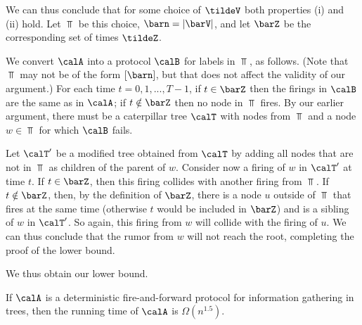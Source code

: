 We can thus conclude that for some choice of $\tildeV$ both properties (i) and (ii)
hold. Let $\barV$ be this choice, $\barn = |\barV|$, and let $\barZ$ be the corresponding
set of times $\tildeZ$.

We convert $\calA$ into a protocol $\calB$ for labels in $\barV$, as follows.
(Note that $\barV$ may not be of the form $[\barn]$, but that does not affect the validity of our argument.)
For each time $t = 0,1,...,T-1$, if $t\in \barZ$ then the firings in $\calB$ are the same as in $\calA$;
if $t\notin\barZ$ then no node in $\barV$ fires.
By our earlier argument, there must be a caterpillar tree $\calT$ with nodes from $\barV$ and a node $w \in \barV$
for which $\calB$ fails. 

Let $\calT'$ be a modified tree obtained from $\calT$ by adding all nodes that are not in $\barV$
as children of the parent of $w$.
Consider now a firing of $w$ in $\calT'$ at time $t$.
If $t \in \barZ$, then this firing  collides with another firing from $\barV$. 
If $t\notin\barZ$, then, by the definition of $\barZ$, there is a node $u$ outside of $\barV$
that fires at the same time (otherwise $t$ would be included in $\barZ$) and is a sibling
of $w$ in $\calT'$. So again, this firing from $w$ will collide with the firing of $u$.
We can thus conclude that the rumor from $w$ will not reach the root, completing the proof of
the lower bound.

We thus obtain our lower bound.



\begin{theorem} \label{thm: fireandforward lower bound}
If $\calA$ is a deterministic fire-and-forward protocol for information gathering
in trees, then the running time of $\calA$ is $\Omega(n^{1.5})$.
\end{theorem}
